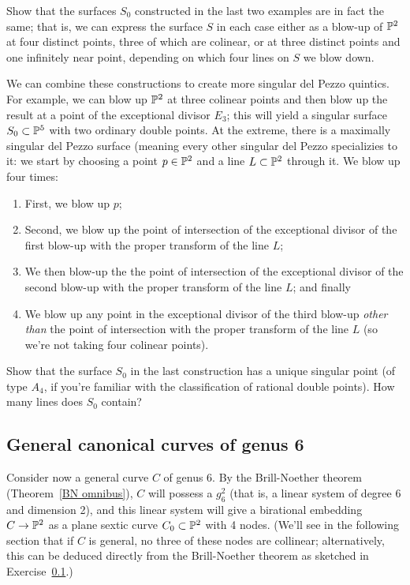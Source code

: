\begin{exercise}
Show that the surfaces $S_0$ constructed in the last two examples are in fact the same; that is, we can express the surface $S$ in each case either as a blow-up of $\PP^2$ at four distinct points, three of which are colinear, or at three distinct points and one infinitely near point, depending on which four lines on $S$ we blow down.
\end{exercise}

We can combine these constructions to create more singular del Pezzo quintics. For example, we can blow up $\PP^2$ at three colinear points and then blow up the result at a point of the exceptional divisor $E_3$; this will yield a singular surface $S_0 \subset \PP^5$ with two ordinary double points. At the extreme, there is a maximally singular del Pezzo surface (meaning every other singular del Pezzo specializies to it: we start by choosing a point $p \in \PP^2$ and a line $L \subset \PP^2$ through it. We blow up four times:

\begin{enumerate}
\item First, we blow up $p$;
\item Second, we blow up the point of intersection of the exceptional divisor of the first blow-up with the proper transform of the line $L$;
\item We then blow-up the the point of intersection of the exceptional divisor of the second blow-up with the proper transform of the line $L$; and finally
\item We blow up any point in the exceptional divisor of the third blow-up \emph{other than} the point of intersection  with the proper transform of the line $L$ (so we're not taking four colinear points).
\end{enumerate}

\begin{exercise}
Show that the surface $S_0$ in the last construction has a unique singular point (of type $A_4$, if you're familiar with the classification of rational double points). How many lines does $S_0$ contain?
\end{exercise}

\subsection{General canonical curves of genus 6}

Consider now a general curve $C$ of genus 6. By the Brill-Noether theorem (Theorem~\ref{BN omnibus}), $C$ will possess a $g^2_6$ (that is, a linear system of degree 6 and dimension 2), and this linear system will give a birational embedding $C \to \PP^2$ as a plane sextic curve $C_0 \subset \PP^2$ with 4 nodes. (We'll see in the following section that if $C$ is general, no three of these nodes are collinear; alternatively, this can be deduced directly from the Brill-Noether theorem as sketched in Exercise~\ref{}.) 

